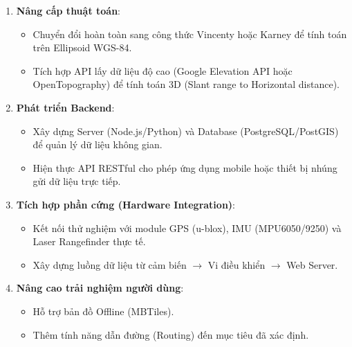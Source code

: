 \begin{enumerate}
    \item \textbf{Nâng cấp thuật toán}:
    \begin{itemize}
        \item Chuyển đổi hoàn toàn sang công thức Vincenty hoặc Karney để tính toán trên Ellipsoid WGS-84.
        \item Tích hợp API lấy dữ liệu độ cao (Google Elevation API hoặc OpenTopography) để tính toán 3D (Slant range to Horizontal distance).
    \end{itemize}
    
    \item \textbf{Phát triển Backend}:
    \begin{itemize}
        \item Xây dựng Server (Node.js/Python) và Database (PostgreSQL/PostGIS) để quản lý dữ liệu không gian.
        \item Hiện thực API RESTful cho phép ứng dụng mobile hoặc thiết bị nhúng gửi dữ liệu trực tiếp.
    \end{itemize}
    
    \item \textbf{Tích hợp phần cứng (Hardware Integration)}:
    \begin{itemize}
        \item Kết nối thử nghiệm với module GPS (u-blox), IMU (MPU6050/9250) và Laser Rangefinder thực tế.
        \item Xây dựng luồng dữ liệu từ cảm biến $\rightarrow$ Vi điều khiển $\rightarrow$ Web Server.
    \end{itemize}
    
    \item \textbf{Nâng cao trải nghiệm người dùng}:
    \begin{itemize}
        \item Hỗ trợ bản đồ Offline (MBTiles).
        \item Thêm tính năng dẫn đường (Routing) đến mục tiêu đã xác định.
    \end{itemize}
\end{enumerate}